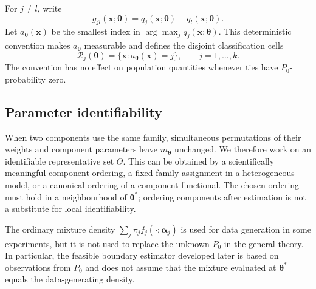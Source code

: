 For $j\ne l$, write
\begin{equation}
 g_{jl}(\mathbf{x};\boldsymbol{\theta})=q_j(\mathbf{x};\boldsymbol{\theta})-q_l(\mathbf{x};\boldsymbol{\theta}).
 \label{eq:pairwise-contrast}
\end{equation}
Let $a_{\boldsymbol{\theta}}(\mathbf{x})$ be the smallest index in
$\arg\max_jq_j(\mathbf{x};\boldsymbol{\theta})$.  This deterministic convention makes
$a_{\boldsymbol{\theta}}$ measurable and defines the disjoint classification cells
\begin{equation}
 \mathcal R_j(\boldsymbol{\theta})=\{\mathbf{x}:a_{\boldsymbol{\theta}}(\mathbf{x})=j\},\qquad j=1,\ldots,k.
 \label{eq:classification-cells}
\end{equation}
The convention has no effect on population quantities whenever ties have
$P_0$-probability zero.

\subsection{Parameter identifiability}

When two components use the same family, simultaneous permutations of their
weights and component parameters leave $m_{\boldsymbol{\theta}}$ unchanged.  We therefore
work on an identifiable representative set $\Theta$.  This can be obtained by
a scientifically meaningful component ordering, a fixed family assignment in
a heterogeneous model, or a canonical ordering of a component functional.
The chosen ordering must hold in a neighbourhood of $\boldsymbol{\theta}^*$; ordering
components after estimation is not a substitute for local identifiability.

The ordinary mixture density
$\sum_j\pi_jf_j(\cdot;\boldsymbol{\alpha}_j)$ is used for data generation in some
experiments, but it is not used to replace the unknown $P_0$ in the general
theory.  In particular, the feasible boundary estimator developed later is
based on observations from $P_0$ and does not assume that the mixture evaluated
at $\boldsymbol{\theta}^*$ equals the data-generating density.

